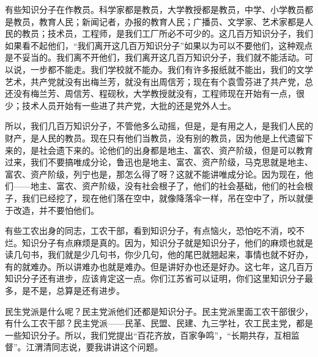 有些知识分子在作教员。科学家都是教员，大学教授都是教员，中学、小学教员都是教员，教育人民；新闻记者，办报的教育人民；广播员、文学家、艺术家都是人民的教员；技术员，工程师，是我们工厂所必不可少的。这几百万知识分子，我们如果看不起他们，“我们离开这几百万知识分子”如果以为可以不要他们，这种观点是不妥当的。我们离不开他们，我们离开这几百万知识分子，我们就不能活动。可以说，一步都不能走。我们学校就不能办。我们有许多报纸就不能出，我们的文学艺术，共产党就没有出梅兰芳，就没有出周信芳；现在有个袁雪芬进了共产党，总还没有梅兰芳、周信芳、程砚秋，大学教授就没有，工程师现在开始有一点，很少；技术人员开始有一些进了共产党，大批的还是党外人士。

所以，我们几百万知识分子，不管他多么动摇，但是，是有用之人，是我们人民的财产，是人民的教员。现在只有他们当教员，没有别的教员，因为他是上代遗留下来的，是社会遗下来的。论他们的出身都是地主、富农、资产阶级，但是可以教育过来，我们不要搞唯成分论，鲁迅也是地主、富农、资产阶级，马克思就是地主、富农、资产阶级，列宁也是，那怎么得了呀？这就不能讲唯成分论。因为现在，他们——地主、富农、资产阶级，没有社会根子了，他们的社会基础，他们的社会根子，我们已经挖了，现在他们落在空中，就像降落伞一样，吊在空中了，所以就便于改造，并不要怕他们。

有些工农出身的同志，工农干部，看到知识分子，有点恼火，恐怕吃不消，咬不烂。知识分子有点麻烦是真的。因为，知识分子就是知识分子，他们的麻烦也就是读几句书，我们就是少几句书，你少几句，他的尾巴就翘起来，事情也就不好办，有的就难办。所以讲难办也就是难办。但是讲好办也还是好办。这七年，这几百万知识分子还有进步，应该肯定这一点。你们江苏省可以证明，你们这里知识分子最多，是不是，总算是还有进步。

民生党派是什么呢？民主党派他们还都是知识分子。民主党派里面工农干部很少，有什么工农干部？民主党派——民革、民盟、民建、九三学社，农工民主党，都是一些知识分子。所以，我们党提出“百花齐放，百家争鸣”，“长期共存，互相监督”。江渭清同志说，要我讲讲这个问题。

